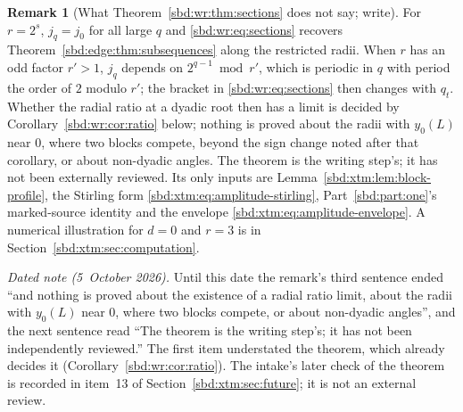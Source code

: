 \documentclass[11pt,a4paper]{article}
\theoremstyle{definition}
\newtheorem{remark}[theorem]{Remark}
\begin{document}
\begin{remark}[What Theorem~\ref{sbd:wr:thm:sections} does not say; write]\label{sbd:wr:rem:sections}
For $r=2^s$, $j_q=j_0$ for all large $q$ and \eqref{sbd:wr:eq:sections}
recovers Theorem~\ref{sbd:edge:thm:subsequences} along the restricted radii.
When $r$ has an odd factor $r'>1$, $j_q$ depends on $2^{q-1}\bmod r'$, which
is periodic in $q$ with period the order of $2$ modulo $r'$; the bracket in
\eqref{sbd:wr:eq:sections} then changes with $q_t$. Whether the radial ratio
at a dyadic root then has a limit is decided by
Corollary~\ref{sbd:wr:cor:ratio} below; nothing is proved about the radii
with $y_0(L)$ near $0$, where two blocks compete, beyond the sign change
noted after that corollary, or about non-dyadic angles. The theorem is the
writing step's; it has not been externally reviewed. Its only
inputs are Lemma~\ref{sbd:xtm:lem:block-profile}, the Stirling form
\eqref{sbd:xtm:eq:amplitude-stirling}, Part~\ref{sbd:part:one}'s marked-source
identity and the envelope \eqref{sbd:xtm:eq:amplitude-envelope}. A numerical
illustration for $d=0$ and $r=3$ is in Section~\ref{sbd:xtm:sec:computation}.

\emph{Dated note (5~October 2026).} Until this date the remark's third
sentence ended ``and nothing is proved about the existence of a radial ratio
limit, about the radii with $y_0(L)$ near $0$, where two blocks compete, or
about non-dyadic angles'', and the next sentence read ``The theorem is the
writing step's; it has not been independently reviewed.'' The first item
understated the theorem, which already decides it
(Corollary~\ref{sbd:wr:cor:ratio}). The intake's later check of the theorem
is recorded in item~13 of Section~\ref{sbd:xtm:sec:future}; it is not an
external review.
\end{remark}
\end{document}

